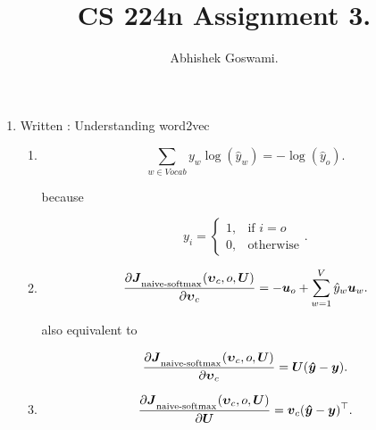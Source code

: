 \documentclass[]{article}
\begin{document}
\title{CS 224n Assignment 3.}
\author{Abhishek Goswami.}
\maketitle

\begin{enumerate}
	\item Written : Understanding word2vec
	
	\begin{enumerate}
		
		\item
		\begin{equation}
		\sum_{w \in Vocab} y_w \log(\hat{y}_w) = - \log(\hat{y}_o).
		\end{equation}

		because
		
		\begin{equation}
		y_{i} = 
\begin{cases}
    1, & \text{if } i = o\\
    0, & \text{otherwise}
\end{cases}.
		\end{equation}
			
		\item
		\begin{equation}
		\frac{\partial 		\boldsymbol{J}_\textsubscript{naive-softmax}(\boldsymbol{\upsilon}_c, o, \boldsymbol{U})}{\partial \boldsymbol{\upsilon}_c} = 
		- \boldsymbol{u}_{o} + \sum_{w=1}^V \hat{y}_w \boldsymbol{u}_{w}.
		\end{equation}

		also equivalent to 
		
		\begin{equation}
		\frac{\partial 		\boldsymbol{J}_\textsubscript{naive-softmax}(\boldsymbol{\upsilon}_c, o, \boldsymbol{U})}{\partial \boldsymbol{\upsilon}_c} = 
		\boldsymbol{U} (\boldsymbol{\hat{y}} - \boldsymbol{y}).
		\end{equation}
		
		\item
		\begin{equation}
		\frac{\partial 		\boldsymbol{J}_\textsubscript{naive-softmax}(\boldsymbol{\upsilon}_c, o, \boldsymbol{U})}{\partial \boldsymbol{U}} = 
		\boldsymbol{v}_{c} (\boldsymbol{\hat{y}} - \boldsymbol{y})^\top.
		\end{equation}
			

\end{enumerate}
\end{enumerate}
\end{document}
